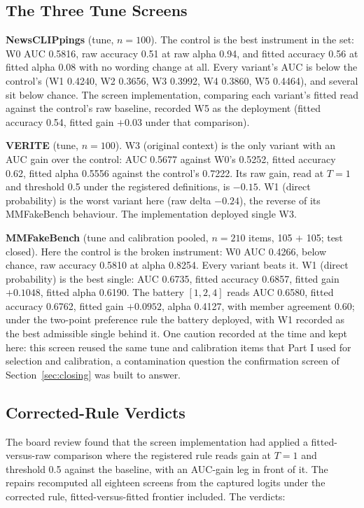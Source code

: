 \documentclass{article} %
\begin{document}
\subsection{The Three Tune Screens}
\textbf{NewsCLIPpings} (tune, \(n=100\)). The control is the best instrument in the set: W0 AUC 0.5816, raw accuracy 0.51 at raw alpha 0.94, and fitted accuracy 0.56 at fitted alpha 0.08 with no wording change at all. Every variant's AUC is below the control's (W1 0.4240, W2 0.3656, W3 0.3992, W4 0.3860, W5 0.4464), and several sit below chance. The screen implementation, comparing each variant's fitted read against the control's raw baseline, recorded W5 as the deployment (fitted accuracy 0.54, fitted gain \(+0.03\) under that comparison).

\textbf{VERITE} (tune, \(n=100\)). W3 (original context) is the only variant with an AUC gain over the control: AUC 0.5677 against W0's 0.5252, fitted accuracy 0.62, fitted alpha 0.5556 against the control's 0.7222. Its raw gain, read at \(T=1\) and threshold 0.5 under the registered definitions, is \(-0.15\). W1 (direct probability) is the worst variant here (raw delta \(-0.24\)), the reverse of its MMFakeBench behaviour. The implementation deployed single W3.

\textbf{MMFakeBench} (tune and calibration pooled, \(n=210\) items, 105 \(+\) 105; test closed). Here the control is the broken instrument: W0 AUC 0.4266, below chance, raw accuracy 0.5810 at alpha 0.8254. Every variant beats it. W1 (direct probability) is the best single: AUC 0.6735, fitted accuracy 0.6857, fitted gain \(+0.1048\), fitted alpha 0.6190. The battery \([1, 2, 4]\) reads AUC 0.6580, fitted accuracy 0.6762, fitted gain \(+0.0952\), alpha 0.4127, with member agreement 0.60; under the two-point preference rule the battery deployed, with W1 recorded as the best admissible single behind it. One caution recorded at the time and kept here: this screen reused the same tune and calibration items that Part I used for selection and calibration, a contamination question the confirmation screen of Section~\ref{sec:closing} was built to answer.

\subsection{Corrected-Rule Verdicts}
The board review found that the screen implementation had applied a fitted-versus-raw comparison where the registered rule reads gain at \(T=1\) and threshold 0.5 against the baseline, with an AUC-gain leg in front of it. The repairs recomputed all eighteen screens from the captured logits under the corrected rule, fitted-versus-fitted frontier included. The verdicts:
\end{document}
